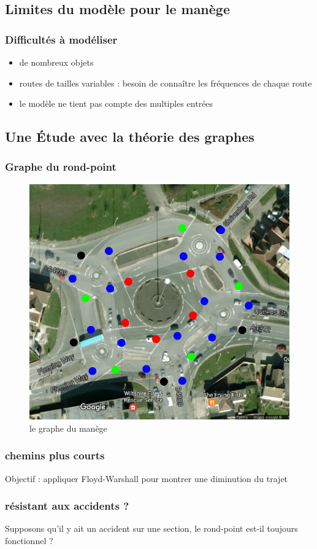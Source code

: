 \documentclass[slidetop,11pt]{beamer}
\begin{document}
	\subsection{Limites du modèle pour le manège}
	
\begin{frame}
	\frametitle{Difficultés à modéliser}
	\begin{itemize}
		\item de nombreux objets
		\item routes de tailles variables : besoin de connaître les fréquences de chaque route
		\item le modèle ne tient pas compte des multiples entrées
	\end{itemize}
\end{frame}
	\subsection{Une Étude avec la théorie des graphes}

\begin{frame}
	\frametitle{Graphe du rond-point}
	\begin{figure}
		\begin{center}
			\includegraphics[scale=0.3]{../manege-graphe}
		\end{center}
		\caption{le graphe du manège}
	\end{figure}
\end{frame}

\begin{frame}
	\frametitle{chemins plus courts}
	Objectif : appliquer Floyd-Warshall pour montrer une diminution du trajet
\end{frame}

\begin{frame}
	\frametitle{résistant aux accidents ?}
	Supposons qu'il y ait un accident sur une section, le rond-point est-il toujours fonctionnel ?
\end{frame}
\end{document}
